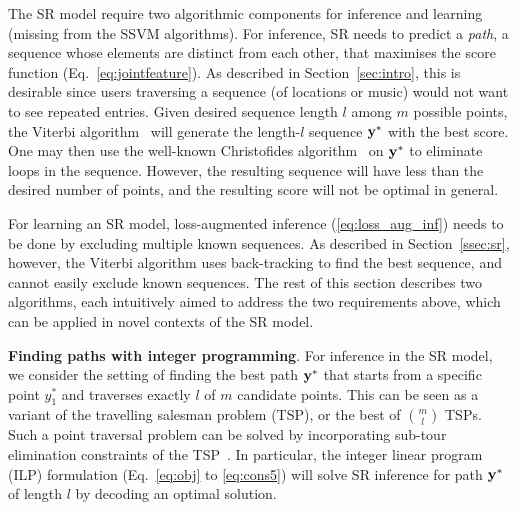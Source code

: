 The SR model require two algorithmic components for inference and learning
(missing from the SSVM algorithms).
For inference, SR needs to predict a {\em path}, \ie a sequence whose elements are distinct from each other,
that maximises the score function (Eq.~\ref{eq:jointfeature}).
As described in Section~\ref{sec:intro}, this is desirable since users traversing a sequence (of locations or music)
would not want to see repeated entries.
Given desired sequence length $l$ among $m$ possible points, the Viterbi algorithm~\cite{tsochantaridis2005large}
will generate the length-$l$ sequence $\mathbf{y}^*$ with the best score. %
One may then use the well-known
Christofides algorithm~\cite{christofides1976} on $\mathbf{y}^*$ to eliminate loops in the sequence.
However, the resulting sequence will have less than the desired number of points, and the resulting score will not be optimal in general.

For learning an SR model, loss-augmented inference (\ref{eq:loss_aug_inf}) needs to be done by excluding multiple known sequences.
As described in Section~\ref{ssec:sr}, %
however, the Viterbi algorithm uses back-tracking to find the best sequence,
and cannot easily exclude known sequences.
The rest of this section describes two algorithms, each intuitively aimed to address %
the two requirements above, which can be applied in novel contexts of the SR model.


\textbf{Finding paths with integer programming}.
For inference in the SR model, 
we consider the setting of finding the best path $\mathbf{y}^*$ that starts from a specific point $y_1^*$ and traverses exactly $l$ of $m$ candidate points.
This can be seen as a variant of the travelling salesman problem (TSP), or the best of ${m \choose l}$ TSPs.
Such a point traversal problem can be solved by incorporating
sub-tour elimination constraints of the TSP~\cite{ijcai15,cikm16paper}.
In particular, the integer linear program (ILP) formulation (Eq.~\ref{eq:obj} to \ref{eq:cons5})
will solve SR inference for path $\mathbf{y}^*$ of length $l$ by decoding an optimal solution.

